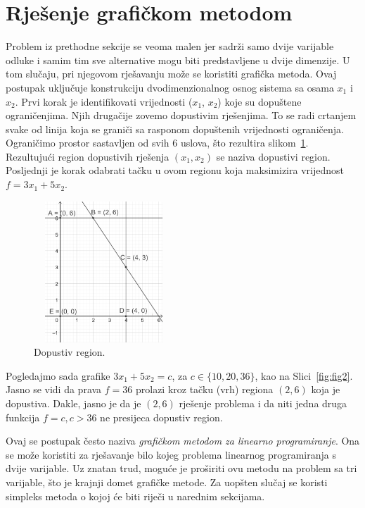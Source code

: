 \documentclass[a4paper, utf8, 11pt, colorlinks]{book}
\begin{document}
\section{Rješenje grafičkom metodom}
 Problem iz prethodne sekcije se veoma malen jer sadrži samo dvije varijable odluke i samim tim sve alternative mogu biti predstavljene u dvije dimenzije. U tom slučaju, pri njegovom rješavanju može se koristiti grafička metoda. Ovaj postupak uključuje konstrukciju dvodimenzionalnog osnog sistema sa osama $x_1$ i $x_2$.  Prvi korak je identifikovati vrijednosti ($x_1$, $x_2$) koje su dopuštene ograničenjima. Njih drugačije zovemo dopustivim rješenjima. To se radi crtanjem svake od 
linija koja se graniči sa rasponom dopuštenih vrijednosti ograničenja. Ograničimo prostor sastavljen od svih 6 uslova, što rezultira slikom~\ref{fig:fig1}.  Rezultujući region dopustivih rješenja $(x_1, x_2)$ se naziva dopustivi region. Posljednji je korak odabrati tačku u ovom regionu  koja maksimizira vrijednost $f = 3x_1 + 5x_2$. 

\begin{figure}
    \centering
    \includegraphics[width=150pt,height=150pt]{fig1.eps}
    \caption{Dopustiv region.}
    \label{fig:fig1}
\end{figure}
Pogledajmo sada grafike $3x_1 + 5 x_2 = c$, za $c \in \{10,20, 36\}$, kao na Slici~\ref{fig:fig2}. Jasno se vidi da prava $f = 36$ prolazi kroz tačku (vrh) regiona $(2,6)$ koja je dopustiva. Dakle, jasno je da je $(2, 6)$ rješenje problema i da niti jedna druga funkcija $f=c, c > 36$ ne presijeca dopustiv region. 

Ovaj se postupak često naziva \emph{grafičkom metodom za linearno programiranje}. Ona se može koristiti za rješavanje bilo kojeg problema linearnog programiranja s dvije varijable. Uz znatan trud, moguće je proširiti ovu metodu na problem sa tri varijable, što je krajnji domet grafičke metode. Za uopšten slučaj se koristi  simpleks metoda o kojoj će biti riječi u narednim sekcijama.
\end{document}
